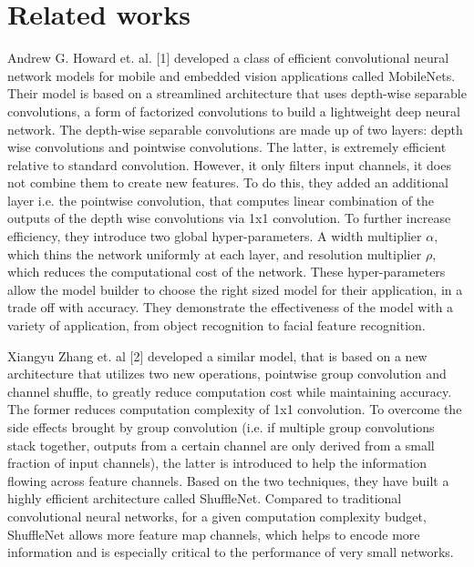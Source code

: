 \documentclass[10pt,twocolumn,letterpaper]{article}
\begin{document}

\section{Related works}
Andrew G. Howard et. al. [1] developed a class of efficient convolutional neural network models for mobile and embedded vision applications called MobileNets. Their model is based on a streamlined architecture that uses depth-wise separable convolutions, a form of factorized convolutions to build a lightweight deep neural network. The depth-wise separable convolutions are made up of two layers: depth wise convolutions and pointwise convolutions. The latter, is extremely efficient relative to standard convolution. However, it only filters input channels, it does not combine them to create new features. To do this, they added an additional layer i.e. the pointwise convolution, that computes linear combination of the outputs of the depth wise convolutions via 1x1 convolution. To further increase efficiency, they introduce two global hyper-parameters. A width multiplier \(\alpha\), which thins the network uniformly at each layer, and resolution multiplier \(\rho\), which reduces the computational cost of the network. These hyper-parameters allow the model builder to choose the right sized model for their application, in a trade off with accuracy. They demonstrate the effectiveness of the model with a variety of application, from object recognition to facial feature recognition.

Xiangyu Zhang et. al [2] developed a similar model, that is based on a new architecture that utilizes two new operations, pointwise group convolution and channel shuffle, to greatly reduce computation cost while maintaining accuracy. The former reduces computation complexity of 1x1 convolution. To overcome the side effects brought by group convolution (i.e. if multiple group convolutions stack together, outputs from a certain channel are only derived from a small fraction of input channels), the latter is introduced to help the information flowing across feature channels. Based on the two techniques, they have built a highly efficient architecture called ShuffleNet. Compared to traditional convolutional neural networks, for a given computation complexity budget, ShuffleNet allows more feature map channels, which helps to encode more information and is especially critical to the performance of very small networks.
\end{document}

